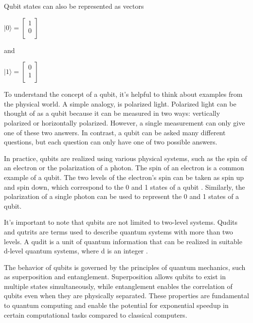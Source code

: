\documentclass[inscr,ack,preface]{diphdthesis}
\begin{document}
 Qubit states can also be represented as vectors
 \begin{center}
 \Large
 $\vert0\rangle = 
    \begin{bmatrix}
    1 \\
    0 \\
    \end{bmatrix}$
\end{center}
\normalsize
and \\
\begin{center}
\Large
$\vert1\rangle = 
\begin{bmatrix}
0 \\
1 \\
\end{bmatrix}$
\end{center}
\normalsize
To understand the concept of a qubit, it's helpful to think about examples from the physical world. A simple analogy, is polarized light. Polarized light can be thought of as a qubit because it can be measured in two ways: vertically polarized or horizontally polarized. However, a single measurement can only give one of these two answers. In contrast, a qubit can be asked many different questions, but each question can only have one of two possible answers\cite{polarized}.

In practice, qubits are realized using various physical systems, such as the spin of an electron or the polarization of a photon. The spin of an electron is a common example of a qubit. The two levels of the electron's spin can be taken as spin up and spin down, which correspond to the 0 and 1 states of a qubit \cite{electron}. Similarly, the polarization of a single photon can be used to represent the 0 and 1 states of a qubit.

It's important to note that qubits are not limited to two-level systems. Qudits and qutrits are terms used to describe quantum systems with more than two levels. A qudit is a unit of quantum information that can be realized in suitable d-level quantum systems, where d is an integer \cite{qudit}.

The behavior of qubits is governed by the principles of quantum mechanics, such as superposition and entanglement. Superposition allows qubits to exist in multiple states simultaneously, while entanglement enables the correlation of qubits even when they are physically separated. These properties are fundamental to quantum computing and enable the potential for exponential speedup in certain computational tasks compared to classical computers.
\end{document}
